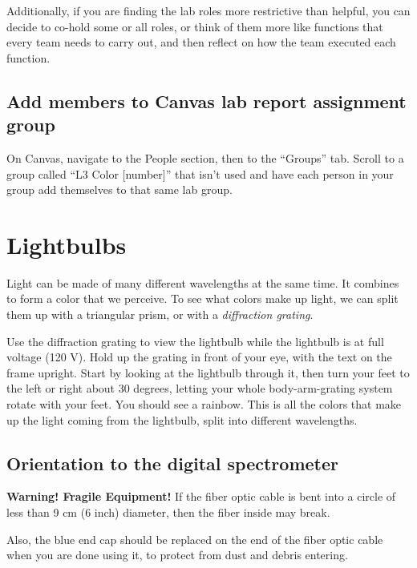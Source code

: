 Additionally, if you are finding the lab roles more restrictive than helpful, you can decide to co-hold some or all roles, or think of them more like functions that every team needs to carry out, and then reflect on how the team executed each function.

\subsection{Add members to Canvas lab report assignment group}

\begin{steps}
	\item On Canvas, navigate to the People section, then to the ``Groups'' tab. Scroll to a group called ``L3 Color [number]'' that isn't used and have each person in your group add themselves to that same lab group.
\end{steps}

\section{Lightbulbs}

Light can be made of many different wavelengths at the same time. It combines to form a color that we perceive. To see what colors make up light, we can split them up with a triangular prism, or with a \textit{diffraction grating}.

\begin{steps}
	\item Use the diffraction grating to view the lightbulb while the lightbulb is at full voltage (120 V). Hold up the grating in front of your eye, with the text on the frame upright. Start by looking at the lightbulb through it, then turn your feet to the left or right about 30 degrees, letting your whole body-arm-grating system rotate with your feet. You should see a rainbow. This is all the colors that make up the light coming from the lightbulb, split into different wavelengths.
\end{steps}

\subsection{Orientation to the digital spectrometer}

\begin{framed}
	\textbf{Warning! Fragile Equipment!} If the fiber optic cable is bent into a circle of less than 9 cm (6 inch) diameter, then the fiber inside may break.
	
	Also, the blue end cap should be replaced on the end of the fiber optic cable when you are done using it, to protect from dust and debris entering.
\end{framed}

